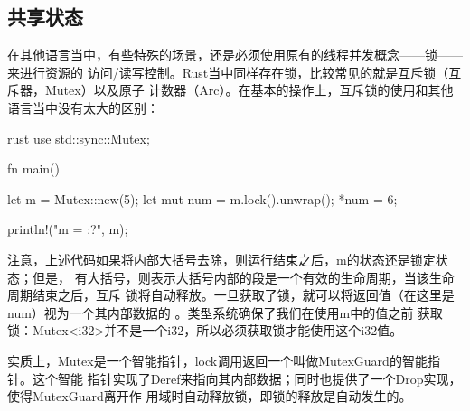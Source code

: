 \subsection{共享状态}
在其他语言当中，有些特殊的场景，还是必须使用原有的线程并发概念——锁——来进行资源的
访问/读写控制。Rust当中同样存在锁，比较常见的就是互斥锁（互斥器，Mutex）以及原子
计数器（Arc）。在基本的操作上，互斥锁的使用和其他语言当中没有太大的区别：
\begin{code-block}{rust}
use std::sync::Mutex;

fn main() {

    let m = Mutex::new(5);
    {
        let mut num = m.lock().unwrap();
        *num = 6;
    }

    println!("m = {:?}", m);
}
\end{code-block}
注意，上述代码如果将内部大括号去除，则运行结束之后，m的状态还是锁定状态；但是，
有大括号，则表示大括号内部的段是一个有效的生命周期，当该生命周期结束之后，互斥
锁将自动释放。一旦获取了锁，就可以将返回值（在这里是num）视为一个其内部数据的
。类型系统确保了我们在使用m中的值之前
获取锁：Mutex<i32>并不是一个i32，所以必须获取锁才能使用这个i32值。

实质上，Mutex是一个智能指针，lock调用返回一个叫做MutexGuard的智能指针。这个智能
指针实现了Deref来指向其内部数据；同时也提供了一个Drop实现，使得MutexGuard离开作
用域时自动释放锁，即锁的释放是自动发生的。

